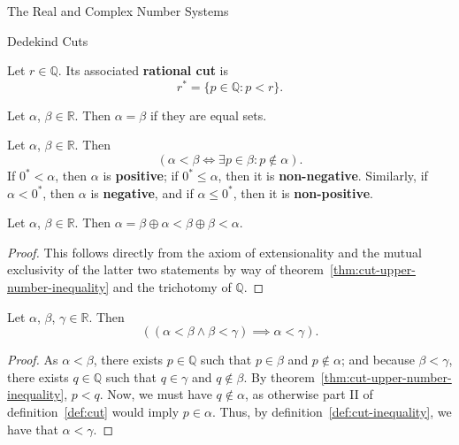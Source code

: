 \begin{chapter}{The Real and Complex Number Systems}
\begin{section}{Dedekind Cuts}
	\begin{definition}
	\label{def:rational cut}
		Let $r \in \mathbb{Q}$. Its associated \textbf{rational cut} is
		\[ r^* = \{p \in \mathbb{Q} : p < r\}. \] 
	\end{definition}

	\begin{definition}
	\label{def:cut-equality}
		Let $\alpha$, $\beta \in \mathbb{R}$. Then $\alpha = \beta$ if they are
		equal sets.
	\end{definition}

	\begin{definition}
	\label{def:cut-inequality}
		Let $\alpha$, $\beta \in \mathbb{R}$. Then
		\[ (\alpha < \beta \iff \exists p \in \beta : p \nin \alpha). \] 
		If $0^* < \alpha$, then $\alpha$ is \textbf{positive}; if $0^* \leq
		\alpha$, then it is \textbf{non-negative}. Similarly, if $\alpha <
		0^*$, then $\alpha$ is \textbf{negative}, and if $\alpha \leq 0^*$,
		then it is \textbf{non-positive}.
	\end{definition}

	\begin{theorem}
	\label{thm:trichotomy}
		Let $\alpha$, $\beta \in \mathbb{R}$. Then $\alpha = \beta \oplus \alpha
		< \beta \oplus \beta < \alpha$.
	\end{theorem}

	\begin{proof}
		This follows directly from the axiom of extensionality and the mutual
		exclusivity of the latter two statements by way of
		theorem~\ref{thm:cut-upper-number-inequality} and
		the trichotomy of $\mathbb{Q}$.
	\end{proof}

	\begin{theorem}
	\label{thm:inequality-transitivity}
		Let $\alpha$, $\beta$, $\gamma \in \mathbb{R}$. Then
		\[ ((\alpha < \beta \land \beta < \gamma) \implies \alpha < \gamma). \] 	
	\end{theorem}

	\begin{proof}
		As $\alpha < \beta$, there exists $p \in \mathbb{Q}$ such that $p \in
		\beta$ and $p \nin \alpha$; and because $\beta < \gamma$, there
		exists $q \in \mathbb{Q}$ such that $q \in \gamma$ and $q \nin
		\beta$. By theorem~\ref{thm:cut-upper-number-inequality}, $p < q$. Now,
		we must have $q \nin \alpha$, as otherwise part II of
		definition~\ref{def:cut} would imply $p \in \alpha$. Thus, by
		definition~\ref{def:cut-inequality}, we have that $\alpha < \gamma$.
	\end{proof}


\end{section}
\end{chapter}
